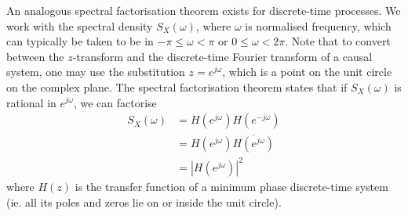 \documentclass[11pt]{report} %
\begin{document}
An analogous spectral factorisation theorem exists for discrete-time processes. We work with the spectral density $S_{X}\left(\omega\right)$, where $\omega$ is normalised frequency, which can typically be taken to be in $-\pi \leq \omega < \pi$ or $0 \leq \omega < 2\pi$. Note that to convert between the $z$-transform and the discrete-time Fourier transform of a causal system, one may use the substitution $z = e^{j\omega}$, which is a point on the unit circle on the complex plane. The spectral factorisation theorem states that if $S_{X}\left(\omega\right)$ is rational in $e^{j\omega}$, we can factorise
\begin{align}
S_{X}\left(\omega\right) &= H\left(e^{j\omega}\right)H\left(e^{-j\omega}\right) \\
&= H\left(e^{j\omega}\right)\overline{H\left(e^{j\omega}\right)} \\
&= \left|H\left(e^{j\omega}\right)\right|^{2}
\end{align}
where $H\left(z\right)$ is the transfer function of a minimum phase discrete-time system (ie. all its poles and zeros lie on or inside the unit circle).
\end{document}
